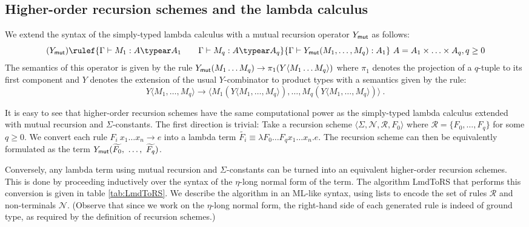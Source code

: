 \subsection{Higher-order recursion schemes and the lambda calculus}
\newcommand\ymut{Y_{\sf mut}}
We extend the syntax of the simply-typed lambda calculus with a mutual recursion operator $\ymut$ as follows:
 $$ (\ymut) \rulef{\Gamma \vdash M_1 : A \typear A_1 \qquad \Gamma \vdash M_q : A \typear A_q}{\Gamma \vdash \ymut (M_1, \ldots, M_q):A_1}\ A = A_1 \times \ldots \times A_q, q \geq 0$$
The semantics of this operator is given by the rule
$ \ymut (M_1 \ldots M_q) \rightarrow \pi_1 (Y \langle M_1 \ldots M_q \rangle)$
where $\pi_1$ denotes the projection of a $q$-tuple to its first component and $Y$ denotes the extension of the usual $Y$-combinator to product types with a semantics given by the rule:
$$ Y \langle M_1, \ldots, M_q \rangle \rightarrow 
\langle M_1 (Y \langle M_1, \ldots, M_q \rangle),
\ldots, M_q (Y \langle M_1, \ldots, M_q \rangle) \rangle \ .$$


It is easy to see that higher-order recursion schemes have the same computational power as the simply-typed lambda calculus extended with mutual recursion and $\Sigma$-constants.
The first direction is trivial: Take a recursion scheme $\langle \Sigma, \mathcal{N}, \mathcal{R}, F_0 \rangle$
where $\mathcal{R} = \{ F_0, \ldots, F_q \}$ for some $q\geq 0$.
We convert each rule $F_i\ x_1 \ldots x_n \rightarrow e$ into a lambda term $\widetilde{F_i} \equiv \lambda F_0 \ldots F_q x_1 \ldots x_n . e$. The recursion scheme can then be equivalently formulated as the term $\ymut ( \widetilde{F_0},\ \ldots,\  \widetilde{F_q})$.

Conversely, any lambda term using mutual recursion and $\Sigma$-constants can be turned into an equivalent higher-order recursion schemes. This is done by proceeding inductively over the syntax of the $\eta$-long normal form of the term.
The algorithm {\sf LmdToRS} that performs this conversion is given in table \ref{tab:LmdToRS}. We describe the algorithm in an ML-like syntax, using lists to encode the set of rules $\mathcal{R}$ and non-terminals $\mathcal{N}$. (Observe that since we work on the $\eta$-long normal form, the right-hand side of each generated rule is indeed of ground type, as required by the definition of recursion schemes.)


